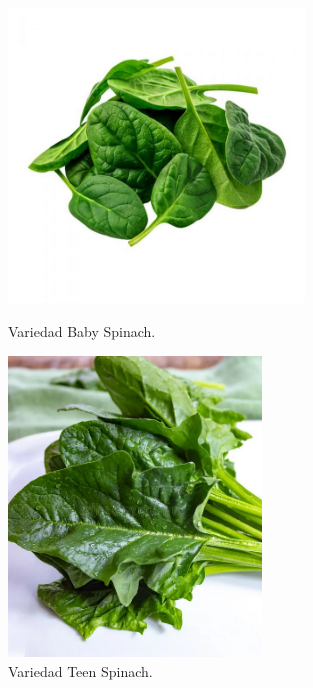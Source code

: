 \begin{figure}[ht!]
    \centering

    \begin{minipage}[b]{0.45\textwidth}
        \centering
        \includegraphics[width=0.7\textwidth]{img/baby_spinach.png}
        \caption{Variedad Baby Spinach.}
        \label{fig:baby}
    \end{minipage}
    \hfill
    \begin{minipage}[b]{0.45\textwidth}
        \centering
        \includegraphics[width=0.6\textwidth]{img/teen_spinach.png}
        \caption{Variedad Teen Spinach.}
        \label{fig:teen}
    \end{minipage}

\end{figure}


